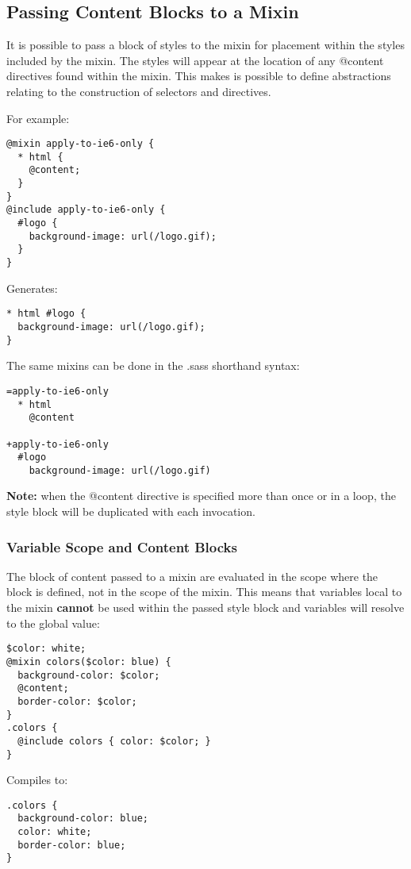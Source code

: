 \documentclass[9pt]{article}
\begin{document}
\subsection{Passing Content Blocks to a Mixin}


 It is possible to pass a block of styles to the mixin for placement within the styles included by the mixin. The styles will appear at the location of any @content directives found within the mixin. This makes is possible to define abstractions relating to the construction of selectors and directives.


 For example:
\begin{verbatim}
@mixin apply-to-ie6-only {
  * html {
    @content;
  }
}
@include apply-to-ie6-only {
  #logo {
    background-image: url(/logo.gif);
  }
}
\end{verbatim}


 Generates:
\begin{verbatim}
* html #logo {
  background-image: url(/logo.gif);
}
\end{verbatim}


 The same mixins can be done in the .sass shorthand syntax:
\begin{verbatim}
=apply-to-ie6-only
  * html
    @content

+apply-to-ie6-only
  #logo
    background-image: url(/logo.gif)
\end{verbatim}


 \textbf{Note:}
 when the @content directive is specified more than once or in a loop, the style block will be duplicated with each invocation.
\subsubsection{Variable Scope and Content Blocks}


 The block of content passed to a mixin are evaluated in the scope where the block is defined, not in the scope of the mixin. This means that variables local to the mixin \textbf{cannot}
 be used within the passed style block and variables will resolve to the global value:
\begin{verbatim}
$color: white;
@mixin colors($color: blue) {
  background-color: $color;
  @content;
  border-color: $color;
}
.colors {
  @include colors { color: $color; }
}
\end{verbatim}


 Compiles to:
\begin{verbatim}
.colors {
  background-color: blue;
  color: white;
  border-color: blue;
}
\end{verbatim}
\end{document}
